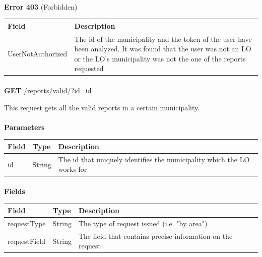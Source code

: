 						\paragraph{}
							\textbf{Error 403} (Forbidden)
							\begin{table}[!h]
								\begin{tabular}{L{0.4\textwidth}L{0.4\textwidth}}
									\toprule
									Field & Description \\
									\midrule
								  	UserNotAuthorized & The id of the municipality and the token of the user have been analyzed. It was found that the user was not an LO or the LO's municipality was not the one of the reports requested \\
								 	\bottomrule
								\end{tabular}
							\end{table}
							
						\paragraph{}
						\textbf{GET} /reports/valid/?id={id}
						
						This request gets all the valid reports in a certain municipality.
						\paragraph{}
							\textbf{Parameters}
							\begin{table}[!h]
								\begin{tabular}{L{0.2\textwidth}L{0.2\textwidth}L{0.4\textwidth}}
									\toprule
									Field & Type & Description \\
									\midrule
								 	id & String & The id that uniquely identifies the municipality which the LO works for \\
								 	\bottomrule
								\end{tabular}
							\end{table}
						\paragraph{}
							\textbf{Fields}
							\begin{table}[!h]
								\begin{tabular}{L{0.25\textwidth}L{0.15\textwidth}L{0.4\textwidth}}
									\toprule
									Field & Type & Description \\
									\midrule
								 	requestType & String & The type of request issued (i.e. "by area") \\
								 	requestField & String & The field that contains precise information on the request \\
								 	\bottomrule
								\end{tabular}
							\end{table}
